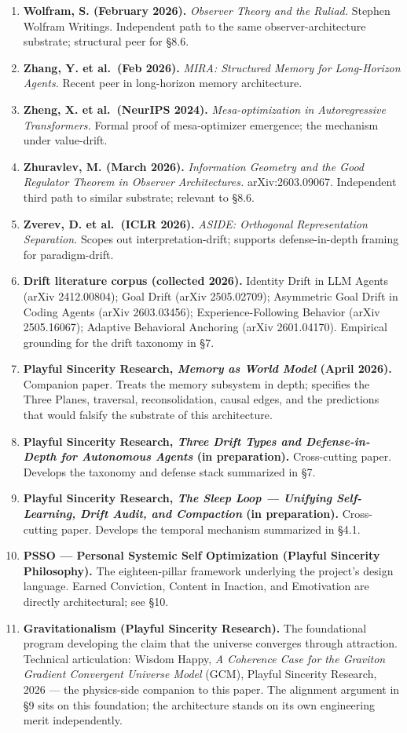 \documentclass[12pt]{article}
\begin{document}
\begin{enumerate}
\item
  \textbf{Wolfram, S. (February 2026).} \emph{Observer Theory and the Ruliad.} Stephen Wolfram Writings. Independent path to the same observer-architecture substrate; structural peer for §8.6.
\item
  \textbf{Zhang, Y. et al.~(Feb 2026).} \emph{MIRA: Structured Memory for Long-Horizon Agents.} Recent peer in long-horizon memory architecture.
\item
  \textbf{Zheng, X. et al.~(NeurIPS 2024).} \emph{Mesa-optimization in Autoregressive Transformers.} Formal proof of mesa-optimizer emergence; the mechanism under value-drift.
\item
  \textbf{Zhuravlev, M. (March 2026).} \emph{Information Geometry and the Good Regulator Theorem in Observer Architectures.} arXiv:2603.09067. Independent third path to similar substrate; relevant to §8.6.
\item
  \textbf{Zverev, D. et al.~(ICLR 2026).} \emph{ASIDE: Orthogonal Representation Separation.} Scopes out interpretation-drift; supports defense-in-depth framing for paradigm-drift.
\item
  \textbf{Drift literature corpus (collected 2026).} Identity Drift in LLM Agents (arXiv 2412.00804); Goal Drift (arXiv 2505.02709); Asymmetric Goal Drift in Coding Agents (arXiv 2603.03456); Experience-Following Behavior (arXiv 2505.16067); Adaptive Behavioral Anchoring (arXiv 2601.04170). Empirical grounding for the drift taxonomy in §7.
\item
  \textbf{Playful Sincerity Research, \emph{Memory as World Model} (April 2026).} Companion paper. Treats the memory subsystem in depth; specifies the Three Planes, traversal, reconsolidation, causal edges, and the predictions that would falsify the substrate of this architecture.
\item
  \textbf{Playful Sincerity Research, \emph{Three Drift Types and Defense-in-Depth for Autonomous Agents} (in preparation).} Cross-cutting paper. Develops the taxonomy and defense stack summarized in §7.
\item
  \textbf{Playful Sincerity Research, \emph{The Sleep Loop --- Unifying Self-Learning, Drift Audit, and Compaction} (in preparation).} Cross-cutting paper. Develops the temporal mechanism summarized in §4.1.
\item
  \textbf{PSSO --- Personal Systemic Self Optimization (Playful Sincerity Philosophy).} The eighteen-pillar framework underlying the project's design language. Earned Conviction, Content in Inaction, and Emotivation are directly architectural; see §10.
\item
  \textbf{Gravitationalism (Playful Sincerity Research).} The foundational program developing the claim that the universe converges through attraction. Technical articulation: Wisdom Happy, \emph{A Coherence Case for the Graviton Gradient Convergent Universe Model} (GCM), Playful Sincerity Research, 2026 --- the physics-side companion to this paper. The alignment argument in §9 sits on this foundation; the architecture stands on its own engineering merit independently.
\end{enumerate}
\end{document}
